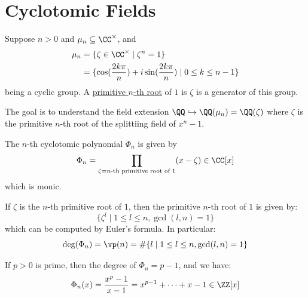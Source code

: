 \section{Cyclotomic Fields}

\begin{definition}
	Suppose \( n > 0 \) and \( \mu_n \subseteq \CC^\times \), and
	\[
		\begin{aligned}
			\mu_n & = \{\zeta \in \CC^\times \; | \; \zeta^n = 1\}                                  \\
			      & = \{\cos(\frac{2k\pi}{n}) + i\sin(\frac{2k \pi}{n}) \; | \; 0 \leq k \leq n-1\}
		\end{aligned}
	\]
	being a cyclic group. A \underline{primitive \( n \)-th root} of \( 1 \) is \( \zeta \) is a
	generator of this group.
\end{definition}
The goal is to understand the field extension \( \QQ \hookrightarrow \QQ(\mu_n) = \QQ(\zeta) \)
where \( \zeta \) is the primitive \( n \)-th root of the splittiing field of \( x^n-1 \).

\begin{definition}
	The \( n \)-th cyclotomic polynomial \( \Phi_n \) is given by
	\[
		\Phi_n = \prod_{\zeta = n\text{-th primitive root of 1}} (x-\zeta) \in \CC[x]
	\]
	which is monic.
\end{definition}

\begin{note}
	If \( \zeta \) is the \( n \)-th primitive root of \( 1 \), then the primitive \( n \)-th root of
	\( 1 \) is given by:
	\[
		\{\zeta^l \; | \; 1 \leq l \leq n, \gcd(l,n) = 1\}
	\]
	which can be computed by Euler's formula. In particular:
	\[
		\deg (\Phi_n) = \vp(n) = \# \{l \; | \; 1\leq l \leq n, \gcd(l,n) = 1\}
	\]
\end{note}

\begin{eg}
	If \( p > 0 \) is prime, then the degree of \( \Phi_n = p - 1 \), and we have:
	\[
		\Phi_n (x) = \frac{x^p - 1}{x - 1} = x^{p-1} + \cdots + x - 1 \in \ZZ[x]
	\]
\end{eg}


